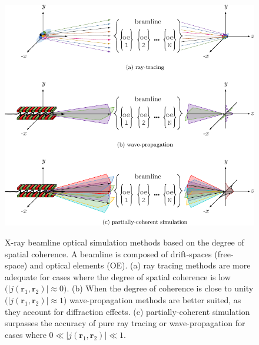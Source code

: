 \begin{refsection}
\begin{figure}[t]
    \centering
    {\includegraphics[width=.65\linewidth]{figures/ch02/optical_simulation.pdf}}
    \caption[X-ray optical simulation methods]{X-ray beamline optical simulation methods based on the degree of spatial coherence. A beamline is composed of drift-spaces (free-space) and optical elements (OE). (a) ray tracing methods are more adequate for cases where the degree of spatial coherence is low $\big(|j(\textbf{r}_1,\textbf{r}_2)|\approx0\big)$. (b) When the degree of coherence is close to unity $\big(|j(\textbf{r}_1,\textbf{r}_2)|\approx1\big)$ wave-propagation methods are better suited, as they account for diffraction effects. (c) partially-coherent simulation surpasses the accuracy of pure ray tracing or wave-propagation for cases where $0\ll|j(\textbf{r}_1,\textbf{r}_2)|\ll1$.}
    \label{fig:simulation_methods}
\end{figure}

\end{refsection}
